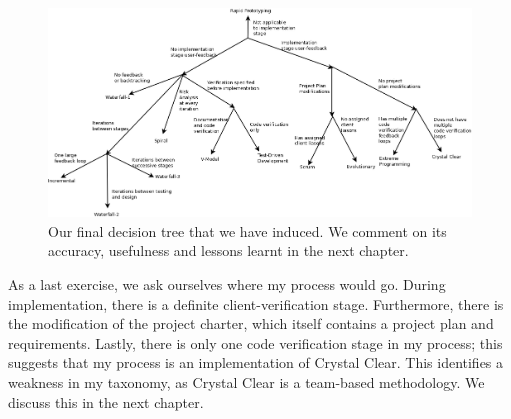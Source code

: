 \begin{figure}[ht!]
  \includegraphics[angle=90,scale=0.35]{media/DecisionTreeFinal}
  \caption{Our final decision tree that we have induced. We comment on its
  accuracy, usefulness and lessons learnt in the next chapter.}
  \label{DecTreeFinal}
\end{figure}

As a last exercise, we ask ourselves where my process would go.
During implementation, there is a definite client-verification stage.
Furthermore, there is the modification of the project charter, which itself
contains a project plan and requirements.
Lastly, there is only one code verification stage in my process; this suggests
that my process is an implementation of Crystal Clear.
This identifies a weakness in my taxonomy, as Crystal Clear is a team-based
methodology.
We discuss this in the next chapter.
